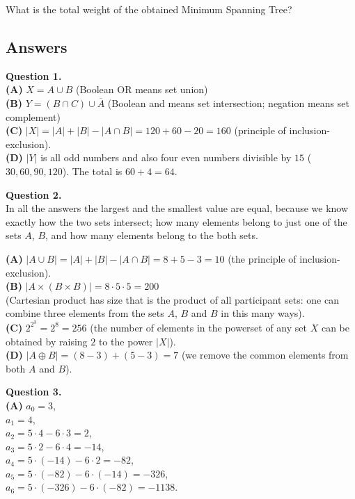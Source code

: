 \documentclass[jou]{apa6}
\begin{document}
What is the total weight of the obtained Minimum Spanning Tree?





\mbox{}
\newpage
\subsection{Answers}


\vspace{4pt}
{\bf Question 1.}\\

{\bf (A)} $X = A \cup B$ (Boolean OR means set union)\\
{\bf (B)} $Y = (B \cap C) \cup \overline{A}$ (Boolean and means set intersection; negation means set complement)\\
{\bf (C)} $|X| = |A| + |B| - |A \cap B| = 120+60-20 = 160$ (principle of inclusion-exclusion).\\
{\bf (D)} $|Y|$ is all odd numbers and also four even numbers divisible by $15$
($30, 60, 90, 120$). The total is $60 + 4 = 64$. 



\vspace{10pt}
{\bf Question 2.}\\
In all the answers the largest and the smallest value are equal, because
we know exactly how the two sets intersect; how many elements belong to just
one of the sets $A$, $B$, and how many elements belong to the both sets. 

{\bf (A)} $|A \cup B| = |A| + |B| - |A \cap B| = 8+5-3 = 10$ (the principle of inclusion-exclusion).\\
{\bf (B)} $|A \times (B \times B)| = 8 \cdot 5 \cdot 5 = 200$\\
(Cartesian product has size that is the product of all participant sets: 
one can combine three elements from the sets $A$, $B$ and $B$ in this many ways).\\
{\bf (C)} $2^{2^3} = 2^8 = 256$ (the number of elements in the powerset 
of any set $X$ can be obtained by raising $2$ to the power $|X|$).\\
{\bf (D)} $|A \oplus B| = (8-3) + (5-3) = 7$ (we remove the common elements from both $A$ and $B$). 






\vspace{10pt}
{\bf Question 3.}\\
{\bf (A)} $a_0 = 3$,\\
$a_1 = 4$,\\
$a_2 = 5\cdot 4 - 6 \cdot 3 = 2$,\\
$a_3 = 5\cdot 2 - 6 \cdot 4 = -14$,\\  
$a_4 = 5\cdot(-14) - 6 \cdot 2 = -82$,\\
$a_5 = 5\cdot(-82) - 6 \cdot (-14) = -326$,\\
$a_6 = 5\cdot(-326) - 6 \cdot (-82) = -1138$.
\end{document}

